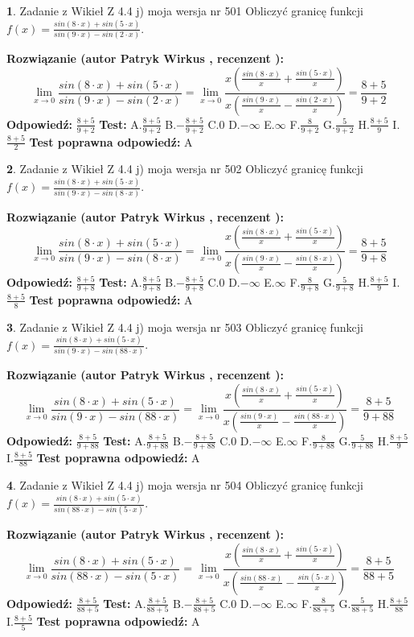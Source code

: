 \documentclass[12pt, a4paper]{article}
\theoremstyle{definition} %
\newtheorem{zad}{}
\newcommand{\zadStart}[1]{\begin{zad}#1\newline}
\newcommand{\zadStop}{\end{zad}}
\newcommand{\rozwStart}[2]{\noindent \textbf{Rozwiązanie (autor #1 , recenzent #2): }\newline}
\newcommand{\rozwStop}{\newline}
\newcommand{\odpStart}{\noindent \textbf{Odpowiedź:}\newline}
\newcommand{\odpStop}{\newline}
\newcommand{\testStart}{\noindent \textbf{Test:}\newline}
\newcommand{\testStop}{\newline}
\newcommand{\kluczStart}{\noindent \textbf{Test poprawna odpowiedź:}\newline}
\newcommand{\kluczStop}{\newline}
\begin{document}
\zadStart{Zadanie z Wikieł Z 4.4 j) moja wersja nr 501}
Obliczyć granicę funkcji $f(x)=\frac{sin(8\cdot x) +sin(5\cdot x)}{sin(9\cdot x) -sin(2\cdot x)}$.
\zadStop
\rozwStart{Patryk Wirkus}{}
$$\lim\limits_{x\to 0}\frac{sin(8\cdot x) +sin(5\cdot x)}{sin(9\cdot x) -sin(2\cdot x)}=\lim\limits_{x\to 0}\frac{x(\frac{sin(8\cdot x)}{x}+\frac{sin(5\cdot x)}{x})}{x(\frac{sin(9\cdot x)}{x}-\frac{sin(2\cdot x)}{x})}=\frac{8+5}{9+2}$$
\rozwStop
\odpStart
$\frac{8+5}{9+2}$
\odpStop
\testStart
A.$\frac{8+5}{9+2}$
B.$-\frac{8+5}{9+2}$
C.$0$
D.$-\infty$
E.$\infty$
F.$\frac{8}{9+2}$
G.$\frac{5}{9+2}$
H.$\frac{8+5}{9}$
I.$\frac{8+5}{2}$
\testStop
\kluczStart
A
\kluczStop



\zadStart{Zadanie z Wikieł Z 4.4 j) moja wersja nr 502}
Obliczyć granicę funkcji $f(x)=\frac{sin(8\cdot x) +sin(5\cdot x)}{sin(9\cdot x) -sin(8\cdot x)}$.
\zadStop
\rozwStart{Patryk Wirkus}{}
$$\lim\limits_{x\to 0}\frac{sin(8\cdot x) +sin(5\cdot x)}{sin(9\cdot x) -sin(8\cdot x)}=\lim\limits_{x\to 0}\frac{x(\frac{sin(8\cdot x)}{x}+\frac{sin(5\cdot x)}{x})}{x(\frac{sin(9\cdot x)}{x}-\frac{sin(8\cdot x)}{x})}=\frac{8+5}{9+8}$$
\rozwStop
\odpStart
$\frac{8+5}{9+8}$
\odpStop
\testStart
A.$\frac{8+5}{9+8}$
B.$-\frac{8+5}{9+8}$
C.$0$
D.$-\infty$
E.$\infty$
F.$\frac{8}{9+8}$
G.$\frac{5}{9+8}$
H.$\frac{8+5}{9}$
I.$\frac{8+5}{8}$
\testStop
\kluczStart
A
\kluczStop



\zadStart{Zadanie z Wikieł Z 4.4 j) moja wersja nr 503}
Obliczyć granicę funkcji $f(x)=\frac{sin(8\cdot x) +sin(5\cdot x)}{sin(9\cdot x) -sin(88\cdot x)}$.
\zadStop
\rozwStart{Patryk Wirkus}{}
$$\lim\limits_{x\to 0}\frac{sin(8\cdot x) +sin(5\cdot x)}{sin(9\cdot x) -sin(88\cdot x)}=\lim\limits_{x\to 0}\frac{x(\frac{sin(8\cdot x)}{x}+\frac{sin(5\cdot x)}{x})}{x(\frac{sin(9\cdot x)}{x}-\frac{sin(88\cdot x)}{x})}=\frac{8+5}{9+88}$$
\rozwStop
\odpStart
$\frac{8+5}{9+88}$
\odpStop
\testStart
A.$\frac{8+5}{9+88}$
B.$-\frac{8+5}{9+88}$
C.$0$
D.$-\infty$
E.$\infty$
F.$\frac{8}{9+88}$
G.$\frac{5}{9+88}$
H.$\frac{8+5}{9}$
I.$\frac{8+5}{88}$
\testStop
\kluczStart
A
\kluczStop



\zadStart{Zadanie z Wikieł Z 4.4 j) moja wersja nr 504}
Obliczyć granicę funkcji $f(x)=\frac{sin(8\cdot x) +sin(5\cdot x)}{sin(88\cdot x) -sin(5\cdot x)}$.
\zadStop
\rozwStart{Patryk Wirkus}{}
$$\lim\limits_{x\to 0}\frac{sin(8\cdot x) +sin(5\cdot x)}{sin(88\cdot x) -sin(5\cdot x)}=\lim\limits_{x\to 0}\frac{x(\frac{sin(8\cdot x)}{x}+\frac{sin(5\cdot x)}{x})}{x(\frac{sin(88\cdot x)}{x}-\frac{sin(5\cdot x)}{x})}=\frac{8+5}{88+5}$$
\rozwStop
\odpStart
$\frac{8+5}{88+5}$
\odpStop
\testStart
A.$\frac{8+5}{88+5}$
B.$-\frac{8+5}{88+5}$
C.$0$
D.$-\infty$
E.$\infty$
F.$\frac{8}{88+5}$
G.$\frac{5}{88+5}$
H.$\frac{8+5}{88}$
I.$\frac{8+5}{5}$
\testStop
\kluczStart
A
\kluczStop
\end{document}
